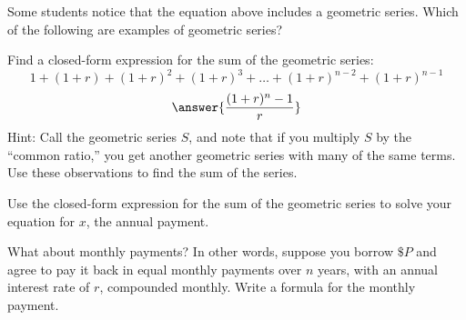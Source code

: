 \documentclass[handout,space,nooutcomes]{ximera}
\begin{document}
\newpage

\begin{question}
Some students notice that the equation above includes a geometric
series.  Which of the following are examples of geometric series?
\begin{multipleChoice}
  \choice[correct]{$0.151515151515\dots$}
\end{multipleChoice}

\end{question}




\begin{question}
Find a closed-form expression for the sum of the geometric series:
  \[
  1 + (1+r) + (1+r)^2 + (1+r)^3 + \dots + (1+r)^{n-2}+ (1+r)^{n-1}
  \]
  \[
  \answer{\frac{(1+r)^n-1}{r}}
  \]
Hint: Call the geometric series $S$, and note that if you multiply $S$ by the ``common ratio,'' you get another geometric series with many of the same terms.  Use these observations to find the sum of the series.   
\begin{freeResponse}
\end{freeResponse}
  \vfill
\end{question}


\newpage

 \begin{question}
 Use the closed-form expression for the sum of the geometric series to solve your equation for $x$, the annual payment.   
 \begin{freeResponse}
 \end{freeResponse}
 \vfill
 \end{question}
\newpage 

\begin{question}
What about monthly payments?  In other words, suppose you borrow $\$P$ and agree to pay it back in equal monthly
payments over $n$ years, with an annual interest rate of $r$, compounded monthly.  
Write a formula for the monthly payment.  
\begin{freeResponse}
\end{freeResponse}
\vfill
\end{question}
\end{document}
